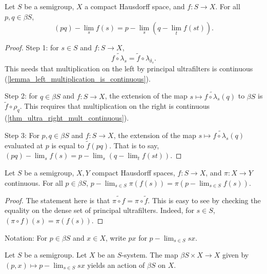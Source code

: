 \begin{theorem}
\label{thm_pq_lim_is_plim_qlim}
\leanok{}
    Let $S$ be a semigroup, $X$ a compact Hausdorff space, and $f: S \to X$.  For all $p, q \in \beta S$,
    \[(pq)-\lim_s f(s) = p-\lim_s (q-\lim_t f(st)).\]
\end{theorem}

\begin{proof}
\leanok{}
    
    Step 1: for $s \in S$ and $f: S \to X$,
    \[\widetilde{f \circ \lambda_s} = \tilde f \circ \lambda_{\delta_s}.\]
    This needs that multiplication on the left by principal ultrafilters is continuous (\cref{lemma_left_multiplication_is_continuous}).

    Step 2: for $q \in \beta S$ and $f: S \to X$, the extension of the map $s \mapsto \widetilde{f \circ \lambda_s}(q)$ to $\beta S$ is $\tilde f \circ \rho_q$. This requires that multiplication on the right is continuous (\cref{thm_ultra_right_mult_continuous}).

    Step 3: For $p, q \in \beta S$ and $f: S \to X$, the extension of the map $s \mapsto \widetilde{f \circ \lambda_s}(q)$ evaluated at $p$ is equal to $\tilde f(pq)$.  That is to say, $(pq)-\lim_s f(s) = p-\lim_s (q-\lim_t f(st))$.
\end{proof}

\begin{theorem}
\label{thm_continuity_and_plim}
\leanok{}
    Let $S$ be a semigroup, $X, Y$ compact Hausdorff spaces, $f: S \to X$, and $\pi: X \to Y$ continuous.  For all $p \in \beta S$, $p-\lim_{s \in S} \pi (f (s)) = \pi (p-\lim_{s \in S} f (s))$.
\end{theorem}

\begin{proof}
\leanok{}
    The statement here is that $\widetilde {\pi \circ f} = \pi \circ \tilde f$.  This is easy to see by checking the equality on the dense set of principal ultrafilters.  Indeed, for $s \in S$, $(\pi \circ f)(s) = \pi(f(s))$.
\end{proof}

Notation: For $p \in \beta S$ and $x \in X$, write $px$ for $p-\lim_{s \in S} sx$.

\begin{theorem}
\label{thm_ultra_semigroup_action}
\leanok{}
    Let $S$ be a semigroup. Let $X$ be an $S$-system.  The map $\beta S \times X \to X$ given by $(p,x) \mapsto p-\lim_{s \in S} sx$ yields an action of $\beta S$ on $X$.
\end{theorem}


